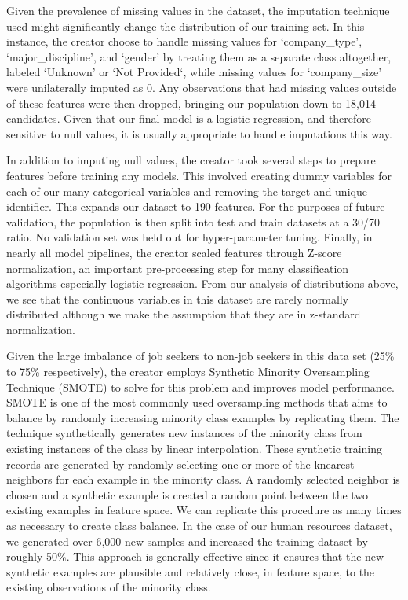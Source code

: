 Given the prevalence of missing values in the dataset, the imputation technique used might significantly change the distribution of our training set.  In this instance, the creator choose to handle missing values for `company\_type', `major\_discipline', and `gender' by treating them as a separate class altogether, labeled `Unknown' or `Not Provided`, while missing values for `company\_size' were unilaterally imputed as 0. Any observations that had missing values outside of these features were then dropped, bringing our population down to 18,014 candidates. Given that our final model is a logistic regression, and therefore sensitive to null values, it is usually appropriate to handle imputations this way.

In addition to imputing null values, the creator took several steps to prepare features before training any models.  This involved creating dummy variables for each of our many categorical variables and removing the target and unique identifier.  This expands our dataset to 190 features. For the purposes of future validation, the population is then split into test and train datasets at a 30/70 ratio.  No validation set was held out for hyper-parameter tuning.  Finally, in nearly all model pipelines, the creator scaled features through Z-score normalization, an important pre-processing step for many classification algorithms especially logistic regression.  From our analysis of distributions above, we see that the continuous variables in this dataset are rarely normally distributed although we make the assumption that they are in z-standard normalization.

Given the large imbalance of job seekers to non-job seekers in this data set (25\% to 75\% respectively), the creator employs Synthetic Minority Oversampling Technique (SMOTE) to solve for this problem and improves model performance.  SMOTE is one of the most commonly used oversampling methods that aims to balance by randomly increasing minority class examples by replicating them. The technique synthetically generates new instances of the minority class from existing instances of the class by linear interpolation.  These synthetic training records are generated by randomly selecting one or more of the k\-nearest neighbors for each example in the minority class.  A randomly selected neighbor is chosen and a synthetic example is created a random point between the two existing examples in feature space.  We can replicate this procedure as many times as necessary to create class balance.  In the case of our human resources dataset, we generated over 6,000 new samples and increased the training dataset by roughly 50\%.
This approach is generally effective since it ensures that the new synthetic examples are plausible and relatively close, in feature space, to the existing observations of the minority class.  


